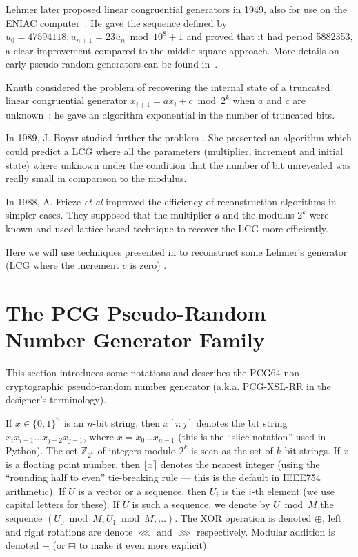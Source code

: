 \documentclass[submission,svgnames,journal=tosc]{iacrtrans}
\begin{document}
Lehmer later proposed linear congruential generators in 1949, also for use on
the ENIAC computer~\cite{Lehmer}. He gave the sequence defined by
$u_0 = 47594118, u_{n+1} = 23 u_n \bmod 10^8 + 1$ and proved that it had period
5882353, a clear improvement compared to the middle-square approach. More
details on early pseudo-random generators can be found in~\cite{Knuth}.

Knuth considered the problem of recovering the internal state of a truncated
linear congruential generator $x_{i+1} = ax_i + c \bmod 2^k$ when $a$ and $c$
are unknown~\cite{Knuth85}; he gave an algorithm exponential in the number of
truncated bits.

In 1989, J. Boyar studied further the problem \cite{Boyar1989}. She presented an algorithm which could predict a LCG where all the parameters (multiplier, increment and initial state) where unknown under the condition that the number of bit unrevealed was really small in comparison to the modulus.

In 1988, A. Frieze \textit{et al} \cite{Frieze} improved the efficiency of reconstruction algorithms in simpler cases. They supposed that the multiplier $a$ and the modulus $2^k$ were known and used lattice-based technique to recover the LCG more efficiently.

Here we will use techniques presented in \cite{Frieze} to reconstruct some Lehmer's generator (LCG where the increment $c$ is zero) \cite{Lehmer}.

\section{The PCG Pseudo-Random Number Generator Family}

This section introduces some notations and describes the \textsf{PCG64}
non-cryptographic pseudo-random number generator (a.k.a. \textsf{PCG-XSL-RR} in
the designer's terminology).

If $x \in \{0, 1\}^n$ is an $n$-bit string, then $x[i:j]$ denotes the bit string
$x_ix_{i+1}\dots x_{j-2}x_{j-1}$, where $x = x_0\dots x_{n-1}$ (this is the
``slice notation'' used in \textsf{Python}). The set $\mathbb{Z}_{2^k}$ of
integers modulo $2^k$ is seen as the set of $k$-bit strings. If $x$ is a
floating point number, then $\lfloor x \rceil$ denotes the nearest integer
(using the ``rounding half to even'' tie-breaking rule --- this is the default
in IEEE754 arithmetic). If $U$ is a vector or a sequence, then $U_i$ is the
$i$-th element (we use capital letters for these). If $U$ is such a sequence, we
denote by $U \bmod M$ the sequence $(U_0 \bmod M, U_1 \bmod M, \dots)$. The XOR
operation is denoted $\oplus$, left and right rotations are denote $\lll$ and
$\ggg$ respectively. Modular addition is denoted $+$ (or $\boxplus$ to make it
even more explicit).
\end{document}
